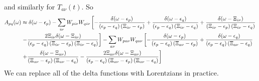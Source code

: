 and similarly for $T_{a\nu}(t)$. So
\begin{align}
    A_{pq}(\omega) &\approx \delta(\omega - \epsilon_p) - \sum_{i\nu} W_{p i \nu} W_{q i \nu} \left[-\frac{\delta(\omega - \epsilon_p)}{\left(\epsilon_p-\epsilon_q\right)\left(\Xi_{i\nu}-\epsilon_p\right)} + \frac{\delta(\omega - \epsilon_q)}{\left(\epsilon_p-\epsilon_q\right)\left(\Xi_{i\nu}-\epsilon_q\right)} + \frac{\delta(\omega - \Xi_{i\nu})}{\left(\Xi_{i\nu}-\epsilon_p\right)\left(\Xi_{i\nu}-\epsilon_q\right)} \right. \\
&\left. - \frac{2\Xi_{i\nu}\delta(\omega - \Xi_{i\nu})}{\left(\epsilon_p-\epsilon_q\right)\left(\Xi_{i\nu}-\epsilon_p\right)\left(\Xi_{i\nu}-\epsilon_q\right)}\right] - \sum_{a\nu} W_{p a \nu} W_{q a \nu} \left[-\frac{\delta(\omega - \epsilon_p)}{\left(\epsilon_p-\epsilon_q\right)\left({\Xi}_{a\nu}-\epsilon_p\right)} + \frac{\delta(\omega - \epsilon_q)}{\left(\epsilon_p-\epsilon_q\right)\left({\Xi}_{a\nu}-\epsilon_q\right)} \right. \\
& \left.+ \frac{\delta(\omega - {\Xi}_{a\nu})}{\left({\Xi}_{a\nu}-\epsilon_p\right)\left({\Xi}_{a\nu}-\epsilon_q\right)}  - \frac{2{\Xi}_{a\nu}\delta(\omega - {\Xi}_{a\nu})}{\left(\epsilon_p-\epsilon_q\right)\left({\Xi}_{a\nu}-\epsilon_p\right)\left({\Xi}_{a\nu}-\epsilon_q\right)}\right] \notag
\end{align}
We can replace all of the delta functions with Lorentzians in practice.
